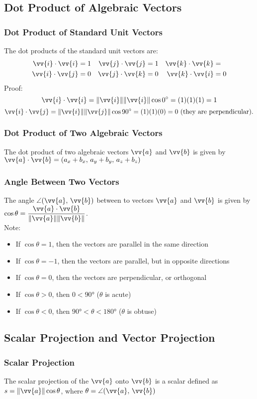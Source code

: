 \documentclass{article}
\newcommand{\mv}[1]{
	\lVert\vv{#1}\rVert
}
\begin{document}
	\subsection{Dot Product of Algebraic Vectors}
	\subsubsection{Dot Product of Standard Unit Vectors}
	The dot products of the standard unit vectors are:
	\begin{align*}
		\vv{i}\cdot\vv{i}&=1&\vv{j}\cdot\vv{j}&=1&\vv{k}\cdot\vv{k}&=\\
		\vv{i}\cdot\vv{j}&=0&\vv{j}\cdot\vv{k}&=0&\vv{k}\cdot\vv{i}&=0
	\end{align*}
	Proof:
	\[\vv{i}\cdot\vv{i}=\mv{i}\mv{i}\cos\ang{0}=(1)(1)(1)=1\]\[\vv{i}\cdot\vv{j}=\mv{i}\mv{j}\cos\ang{90}=(1)(1)(0)=0 \text{ (they are perpendicular).}\]
	\subsubsection{Dot Product of Two Algebraic Vectors}
	The dot product of two algebraic vectors $\vv{a}$ and $\vv{b}$ is given by $\vv{a}\cdot\vv{b}=(a_x+b_x,\,a_y+b_y,\,a_z+b_z)$
	\subsubsection{Angle Between Two Vectors}
	The angle $\angle(\vv{a},\,\vv{b})$ between to vectors $\vv{a}$ and $\vv{b}$ is given by $\cos\theta=\dfrac{\vv{a}\cdot\vv{b}}{\mv{a}\mv{b}}$.\\Note:
	\begin{itemize}
		\item If $\cos\theta=1$, then the vectors are parallel in the same direction
		\item If $\cos\theta=-1$, then the vectors are parallel, but in opposite directions
		\item If $\cos\theta=0$, then the vectors are perpendicular, or orthogonal
		\item If $\cos\theta>0$, then $0<\ang{90}$ ($\theta$ is acute)
		\item If $\cos\theta<0$, then $\ang{90}<\theta<\ang{180}$ ($\theta$ is obtuse)
	\end{itemize}
	\subsection{Scalar Projection and Vector Projection}
	\subsubsection{Scalar Projection}
	The scalar projection of the $\vv{a}$ onto $\vv{b}$ is a scalar defined as $s=\mv{a}\cos\theta$, where $\theta=\angle(\vv{a},\,\vv{b})$
\end{document}
